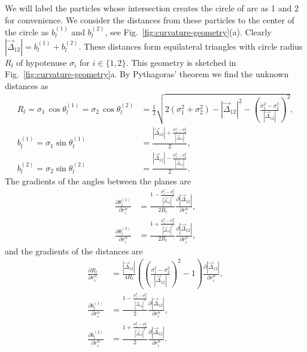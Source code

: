 \documentclass[11pt,twoside]{report}
\begin{document}
We will label the particles whose intersection creates the circle of arc as 1 and 2 for convenience.
We consider the distances from these particles to the center of the circle as $b_l^{(1)}$ and $b_l^{(2)}$, see Fig.\ \ref{fig:curvature-geometry}(a).
Clearly $|\vec{\Delta}_{12}| = b_l^{(1)} + b_l^{(2)}$.
These distances form equilateral triangles with circle radius $R_l$ of hypotenuse $\sigma_i$ for $i \in \{1,2\}$.
This geometry is sketched in Fig.\ \ref{fig:curvature-geometry}a.
By Pythagoras' theorem we find the unknown distances as
\begin{align}
  R_l
  = \sigma_1 \, \cos{\theta_l^{(1)}}
  = \sigma_2 \, \cos{\theta_l^{(2)}}
  &= \frac{1}{2} \sqrt{
      2(\sigma_1^2 + \sigma_2^2) - |\vec{\Delta}_{12}|^2 -
      \left( \frac{\sigma_1^2 - \sigma_2^2}{|\vec{\Delta}_{12}|} \right)^2
    }, \\
  b_l^{(1)} = \sigma_1 \sin{\theta_l^{(1)}} &=
  \frac{ |\vec{\Delta}_{12}| + \frac{\sigma_1^2 - \sigma_2^2}{|\vec{\Delta}_{12}|} }{2}, \\
  b_l^{(2)} = \sigma_2 \sin{\theta_l^{(2)}} &=
  \frac{ |\vec{\Delta}_{12}| - \frac{\sigma_1^2 - \sigma_2^2}{|\vec{\Delta}_{12}|} }{2}.
\end{align}
The gradients of the angles between the planes are
\begin{subequations}
\begin{align}
  \frac{\partial \theta_l^{(1)}}{\partial r_i^\alpha} &=
  \frac{ 1 - \frac{\sigma_1^2 - \sigma_2^2}{|\vec{\Delta}_{12}|^2} }{2R_l}
  \frac{\partial |\vec{\Delta}_{12}|}{\partial r_i^\alpha}, \\
  \frac{\partial \theta_l^{(2)}}{\partial r_i^\alpha} &=
  \frac{ 1 + \frac{\sigma_1^2 - \sigma_2^2}{|\vec{\Delta}_{12}|^2} }{2R_l}
  \frac{\partial |\vec{\Delta}_{12}|}{\partial r_i^\alpha},
\end{align}
\end{subequations}
and the gradients of the distances are
\begin{subequations}
\begin{align}
  \frac{\partial R_l}{\partial r_i^\alpha} &=
  \frac{|\vec{\Delta}_{12}|}{4R_l}
  \left(
  \left( \frac{\sigma_1^2 - \sigma_2^2}{|\vec{\Delta}_{12}|} \right)^2 - 1 \right)
  \frac{\partial |\vec{\Delta}_{12}|}{\partial r_i^\alpha}, \\
  \frac{\partial b_l^{(1)}}{\partial r_i^\alpha} &=
  \frac{ 1 - \frac{\sigma_1^2 - \sigma_2^2}{|\vec{\Delta}_{12}|^2} }{2}
  \frac{\partial |\vec{\Delta}_{12}|}{\partial r_i^\alpha}, \\
  \frac{\partial b_l^{(2)}}{\partial r_i^\alpha} &=
  \frac{ 1 + \frac{\sigma_1^2 - \sigma_2^2}{|\vec{\Delta}_{12}|^2} }{2}
  \frac{\partial |\vec{\Delta}_{12}|}{\partial r_i^\alpha}.
\end{align}
\end{subequations}
\end{document}
